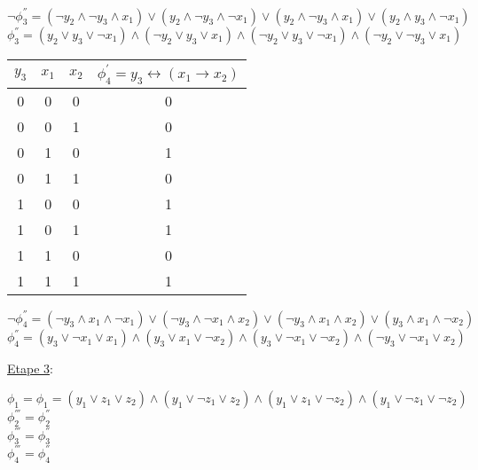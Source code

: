 \documentclass[11pt]{article}
\begin{document}
\smallskip

\begin{center}
    $\lnot \phi_3^{''} = (\lnot y_2 \land \lnot y_3 \land  x_1) \lor (y_2 \land \lnot y_3 \land \lnot x_1) \lor (y_2 \land \lnot y_3 \land x_1) \lor (y_2 \land y_3 \land \lnot x_1) $ \\
    $\phi_3^{''} = (y_2 \lor y_3 \lor \lnot x_1) \land (\lnot y_2 \lor y_3 \lor x_1) \land (\lnot y_2 \lor y_3 \lor \lnot x_1) \land (\lnot y_2 \lor \lnot y_3 \lor x_1) $
\end{center}

\bigskip

\begin{center}
\begin{tabular}{ |c|c|c|c|}
 \hline 
 $y_3$ & $x_1$ & $x_2$ & $\phi_4^{'}= y_3 \leftrightarrow (x_1 \rightarrow x_2)$ \\   
 \hline 
0 & 0 & 0 & 0 \\
  \hline 
0 & 0 & 1 & 0 \\
  \hline 
0 & 1 & 0 & 1 \\
  \hline 
0 & 1 & 1 & 0 \\
  \hline 
1 & 0 & 0 & 1 \\
  \hline 
1 & 0 & 1 & 1 \\
  \hline 
1 & 1 & 0 & 0 \\
  \hline 
1 & 1 & 1 & 1 \\
  \hline 
\end{tabular}
\end{center}

\smallskip

\begin{center}
    $\lnot \phi_4^{''} = (\lnot y_3 \land x_1 \land \lnot x_1) \lor (\lnot y_3 \land \lnot x_1 \land x_2) \lor (\lnot y_3 \land x_1 \land x_2) \lor (y_3 \land x_1 \land \lnot x_2) $ \\
    $\phi_4^{''} = (y_3 \lor \lnot x_1 \lor x_1) \land (y_3 \lor x_1 \lor \lnot x_2) \land (y_3 \lor \lnot x_1 \lor \lnot x_2) \land (\lnot y_3 \lor \lnot x_1 \lor x_2) $
\end{center}

\bigskip

\underline{Etape 3}:

\bigskip

\begin{center}
    $\phi_1 = \phi_1 = (y_1 \lor z_1 \lor z_2) \land (y_1 \lor \lnot z_1 \lor z_2) \land (y_1 \lor z_1 \lor \lnot z_2) \land (y_1 \lor \lnot z_1 \lor \lnot z_2)$\\
    \smallskip
    $\phi_2^{'''} = \phi_2^{''}$\\
    \smallskip
    $\phi_3^{'''} = \phi_3^{''}$\\
    \smallskip
    $\phi_4^{'''} = \phi_4^{''}$
\end{center}
\end{document}
